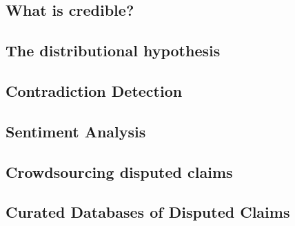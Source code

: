 
\subsection{What is credible?}


\subsection{The distributional hypothesis}

\subsection{Contradiction Detection}

\subsection{Sentiment Analysis}

\subsection{Crowdsourcing disputed claims}


\subsection{Curated Databases of Disputed Claims}

